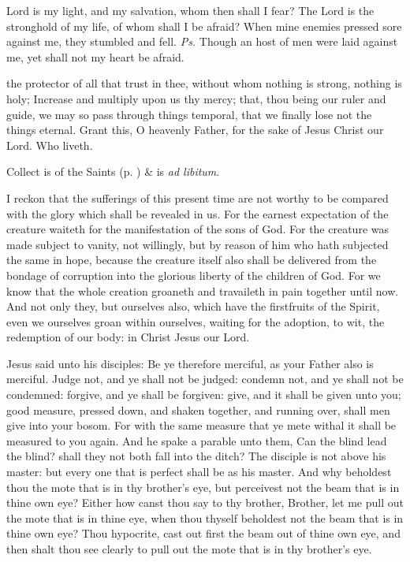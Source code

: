 \introit
{} Lord is my light, and my salvation, whom then shall I fear? The Lord is the stronghold of my life, of whom shall I be afraid? When mine enemies pressed sore against me, they stumbled and fell. \textit{Ps.} Though an host of men were laid against me, yet shall not my heart be afraid.

\collect
{} the protector of all that trust in thee, without whom nothing is strong, nothing is holy; Increase and multiply upon us thy mercy; that, thou being our ruler and guide, we may so pass through things temporal, that we finally lose not the things eternal. Grant this, O heavenly Father, for the sake of Jesus Christ our Lord. Who liveth.
\begin{rubric}
     Collect is of the Saints (p. \pageref{SPSaints}) \&  is \emph{ad libitum}.
\end{rubric}

 I reckon that the sufferings of this present time are not worthy to be compared with the glory which shall be revealed in us. For the earnest expectation of the creature waiteth for the manifestation of the sons of God. For the creature was made subject to vanity, not willingly, but by reason of him who hath subjected the same in hope, because the creature itself also shall be delivered from the bondage of corruption into the glorious liberty of the children of God. For we know that the whole creation groaneth and travaileth in pain together until now. And not only they, but ourselves also, which have the firstfruits of the Spirit, even we ourselves groan within ourselves, waiting for the adoption, to wit, the redemption of our body: in Christ Jesus our Lord.


 Jesus said unto his disciples: Be ye therefore merciful, as your Father also is merciful. Judge not, and ye shall not be judged: condemn not, and ye shall not be condemned: forgive, and ye shall be forgiven: give, and it shall be given unto you; good measure, pressed down, and shaken together, and running over, shall men give into your bosom. For with the same measure that ye mete withal it shall be measured to you again. And he spake a parable unto them, Can the blind lead the blind? shall they not both fall into the ditch? The disciple is not above his master: but every one that is perfect shall be as his master. And why beholdest thou the mote that is in thy brother's eye, but perceivest not the beam that is in thine own eye? Either how canst thou say to thy brother, Brother, let me pull out the mote that is in thine eye, when thou thyself beholdest not the beam that is in thine own eye? Thou hypocrite, cast out first the beam out of thine own eye, and then shalt thou see clearly to pull out the mote that is in thy brother's eye.

